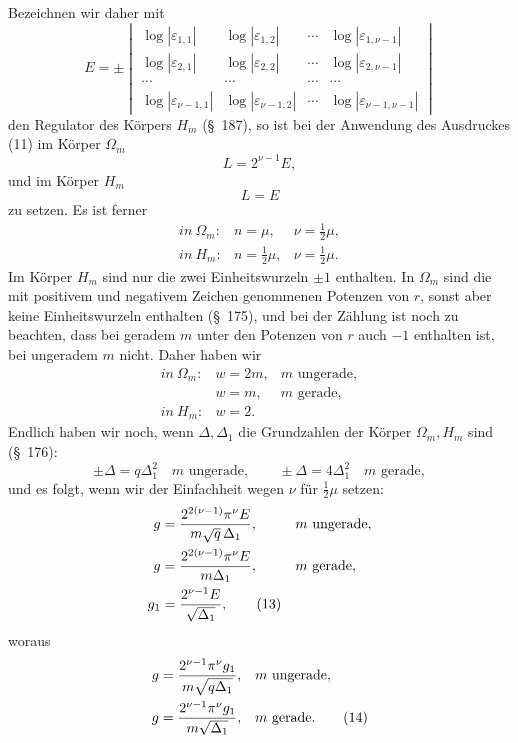 \documentclass[11pt]{article}
\providecommand{\eps}{\varepsilon}
\providecommand{\eps}{\varepsilon}
\begin{document}
Bezeichnen wir daher mit
\begin{equation}
E=\pm\begin{vmatrix}
\log|\eps_{1,1}|&\log|\eps_{1,2}|&\cdots&\log|\eps_{1,\nu-1}|\\
\log|\eps_{2,1}|&\log|\eps_{2,2}|&\cdots&\log|\eps_{2,\nu-1}|\\
\cdots&\cdots&\cdots&\cdots\\
\log|\eps_{\nu-1,1}|&\log|\eps_{\nu-1,2}|&\cdots&\log|\eps_{\nu-1,\nu-1}|
\end{vmatrix}
\tag{12}
\end{equation}
den Regulator des Körpers $H_m$ (\S~187), so ist bei der Anwendung des Ausdruckes (11) im Körper $\Omega_m$
\[
L=2^{\nu-1}E,
\]
und im Körper $H_m$
\[
L=E
\]
zu setzen. Es ist ferner
\[
\begin{array}{lll}
in\ \Omega_m: & n=\mu, & \nu=\frac12\mu,\\
in\ H_m: & n=\frac12\mu, & \nu=\frac12\mu.
\end{array}
\]
Im Körper $H_m$ sind nur die zwei Einheitswurzeln $\pm1$ enthalten. In $\Omega_m$ sind die mit positivem und negativem Zeichen genommenen Potenzen von $r$, sonst aber keine Einheitswurzeln enthalten (\S~175), und bei der Zählung ist noch zu beachten, dass bei geradem $m$ unter den Potenzen von $r$ auch $-1$ enthalten ist, bei ungeradem $m$ nicht. Daher haben wir
\[
\begin{array}{lll}
in\ \Omega_m: & w=2m, & m\text{ ungerade},\\
& w=m, & m\text{ gerade},\\
in\ H_m: & w=2.&
\end{array}
\]
Endlich haben wir noch, wenn $\Delta,\Delta_1$ die Grundzahlen der Körper $\Omega_m,H_m$ sind (\S~176):
\[
\pm\Delta=q\Delta_1^2\quad m\text{ ungerade},
\qquad
\pm\Delta=4\Delta_1^2\quad m\text{ gerade},
\]
und es folgt, wenn wir der Einfachheit wegen $\nu$ für $\frac12\mu$ setzen:
\begin{align}
g&=\frac{2^{2(\nu-1)}\pi^\nu E}{m\sqrt q\,\Delta_1}, &&m\text{ ungerade},\notag\\
g&=\frac{2^{2(\nu-1)}\pi^\nu E}{m\Delta_1}, &&m\text{ gerade},\notag\\
g_1&=\frac{2^{\nu-1}E}{\sqrt{\Delta_1}},\tag{13}
\end{align}
woraus
\begin{align}
g&=\frac{2^{\nu-1}\pi^\nu g_1}{m\sqrt{q\Delta_1}}, &&m\text{ ungerade},\notag\\
g&=\frac{2^{\nu-1}\pi^\nu g_1}{m\sqrt{\Delta_1}}, &&m\text{ gerade}.\tag{14}
\end{align}
\end{document}

